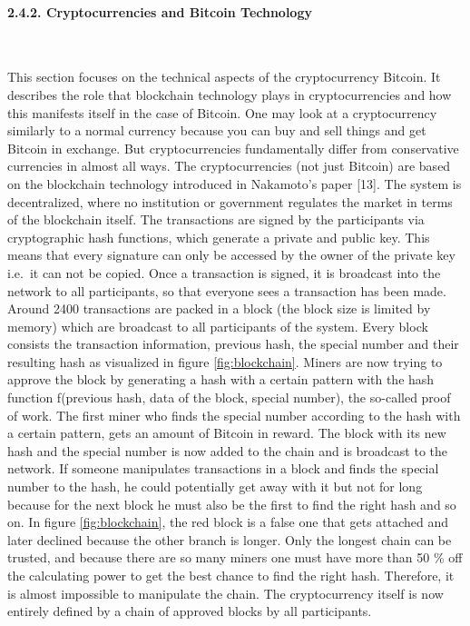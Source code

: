 \documentclass[
]{article}
\begin{document}
\newpage

\hypertarget{Bitcoin_tec}{%
\paragraph{2.4.2. Cryptocurrencies and Bitcoin
Technology}\label{Bitcoin_tec}}

~

This section focuses on the technical aspects of the cryptocurrency
Bitcoin. It describes the role that blockchain technology plays in
cryptocurrencies and how this manifests itself in the case of Bitcoin.
One may look at a cryptocurrency similarly to a normal currency because
you can buy and sell things and get Bitcoin in exchange. But
cryptocurrencies fundamentally differ from conservative currencies in
almost all ways. The cryptocurrencies (not just Bitcoin) are based on
the blockchain technology introduced in Nakamoto's paper {[}13{]}. The
system is decentralized, where no institution or government regulates
the market in terms of the blockchain itself. The transactions are
signed by the participants via cryptographic hash functions, which
generate a private and public key. This means that every signature can
only be accessed by the owner of the private key i.e.~it can not be
copied. Once a transaction is signed, it is broadcast into the network
to all participants, so that everyone sees a transaction has been made.
Around 2400 transactions are packed in a block (the block size is
limited by memory) which are broadcast to all participants of the
system. Every block consists the transaction information, previous hash,
the special number and their resulting hash as visualized in figure
\ref{fig:blockchain}. Miners are now trying to approve the block by
generating a hash with a certain pattern with the hash function
f(previous hash, data of the block, special number), the so-called proof
of work. The first miner who finds the special number according to the
hash with a certain pattern, gets an amount of Bitcoin in reward. The
block with its new hash and the special number is now added to the chain
and is broadcast to the network. If someone manipulates transactions in
a block and finds the special number to the hash, he could potentially
get away with it but not for long because for the next block he must
also be the first to find the right hash and so on. In figure
\ref{fig:blockchain}, the red block is a false one that gets attached
and later declined because the other branch is longer. Only the longest
chain can be trusted, and because there are so many miners one must have
more than 50 \% off the calculating power to get the best chance to find
the right hash. Therefore, it is almost impossible to manipulate the
chain. The cryptocurrency itself is now entirely defined by a chain of
approved blocks by all participants.
\end{document}
